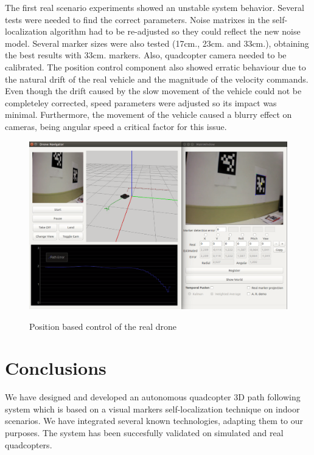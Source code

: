\documentclass{styles/svproc}
\begin{document}
	The first real scenario experiments showed an unstable system behavior. Several tests were needed to find the correct parameters. Noise matrixes in the self-localization algorithm had to be re-adjusted so they could reflect the new noise model. Several marker sizes were also tested (17cm., 23cm.  and 33cm.), obtaining the best results with 33cm. markers. Also, quadcopter camera needed to be calibrated. The position control component also showed erratic behaviour due to the natural drift of the real vehicle and the magnitude of the velocity commands. Even though the drift caused by the slow movement of the vehicle could not be completeley corrected, speed parameters were adjusted so its impact was minimal. Furthermore, the movement of the vehicle caused a blurry effect on cameras, being angular speed a critical factor for this issue.
	
	\begin{figure}[h!]
          \begin{center}
            {\includegraphics[width=12cm]{appcapture.png}}
          \end{center}
          \caption{Position based control of the real drone}
          \label{fig:realnavigation}
	\end{figure}
        

\section{Conclusions}

	We have designed and developed an autonomous quadcopter 3D path following system which is based on a visual markers self-localization technique on indoor scenarios. We have integrated several known technologies, adapting them to our purposes. The system has been succesfully validated on simulated and real quadcopters.
\end{document}
